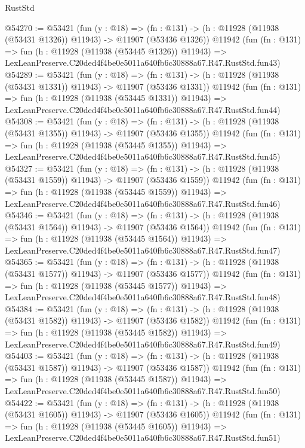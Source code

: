 \begin{lexlean}{RustStd}
\begin{coremodule}
@54270 := @53421
    (fun (y : @18) =>
    (fn : @131) -> (h : @11928 (@11938 (@53431 @1326)) @11943) -> @11907 (@53436 @1326))
    @11942
    (fun (fn : @131) =>
    fun (h : @11928 (@11938 (@53445 @1326)) @11943) =>
    LexLeanPreserve.C20ded4f4be0e5011a640fb6c30888a67.R47.RustStd.fun43)
@54289 := @53421
    (fun (y : @18) =>
    (fn : @131) -> (h : @11928 (@11938 (@53431 @1331)) @11943) -> @11907 (@53436 @1331))
    @11942
    (fun (fn : @131) =>
    fun (h : @11928 (@11938 (@53445 @1331)) @11943) =>
    LexLeanPreserve.C20ded4f4be0e5011a640fb6c30888a67.R47.RustStd.fun44)
@54308 := @53421
    (fun (y : @18) =>
    (fn : @131) -> (h : @11928 (@11938 (@53431 @1355)) @11943) -> @11907 (@53436 @1355))
    @11942
    (fun (fn : @131) =>
    fun (h : @11928 (@11938 (@53445 @1355)) @11943) =>
    LexLeanPreserve.C20ded4f4be0e5011a640fb6c30888a67.R47.RustStd.fun45)
@54327 := @53421
    (fun (y : @18) =>
    (fn : @131) -> (h : @11928 (@11938 (@53431 @1559)) @11943) -> @11907 (@53436 @1559))
    @11942
    (fun (fn : @131) =>
    fun (h : @11928 (@11938 (@53445 @1559)) @11943) =>
    LexLeanPreserve.C20ded4f4be0e5011a640fb6c30888a67.R47.RustStd.fun46)
@54346 := @53421
    (fun (y : @18) =>
    (fn : @131) -> (h : @11928 (@11938 (@53431 @1564)) @11943) -> @11907 (@53436 @1564))
    @11942
    (fun (fn : @131) =>
    fun (h : @11928 (@11938 (@53445 @1564)) @11943) =>
    LexLeanPreserve.C20ded4f4be0e5011a640fb6c30888a67.R47.RustStd.fun47)
@54365 := @53421
    (fun (y : @18) =>
    (fn : @131) -> (h : @11928 (@11938 (@53431 @1577)) @11943) -> @11907 (@53436 @1577))
    @11942
    (fun (fn : @131) =>
    fun (h : @11928 (@11938 (@53445 @1577)) @11943) =>
    LexLeanPreserve.C20ded4f4be0e5011a640fb6c30888a67.R47.RustStd.fun48)
@54384 := @53421
    (fun (y : @18) =>
    (fn : @131) -> (h : @11928 (@11938 (@53431 @1582)) @11943) -> @11907 (@53436 @1582))
    @11942
    (fun (fn : @131) =>
    fun (h : @11928 (@11938 (@53445 @1582)) @11943) =>
    LexLeanPreserve.C20ded4f4be0e5011a640fb6c30888a67.R47.RustStd.fun49)
@54403 := @53421
    (fun (y : @18) =>
    (fn : @131) -> (h : @11928 (@11938 (@53431 @1587)) @11943) -> @11907 (@53436 @1587))
    @11942
    (fun (fn : @131) =>
    fun (h : @11928 (@11938 (@53445 @1587)) @11943) =>
    LexLeanPreserve.C20ded4f4be0e5011a640fb6c30888a67.R47.RustStd.fun50)
@54422 := @53421
    (fun (y : @18) =>
    (fn : @131) -> (h : @11928 (@11938 (@53431 @1605)) @11943) -> @11907 (@53436 @1605))
    @11942
    (fun (fn : @131) =>
    fun (h : @11928 (@11938 (@53445 @1605)) @11943) =>
    LexLeanPreserve.C20ded4f4be0e5011a640fb6c30888a67.R47.RustStd.fun51)

\end{coremodule}
\end{lexlean}
